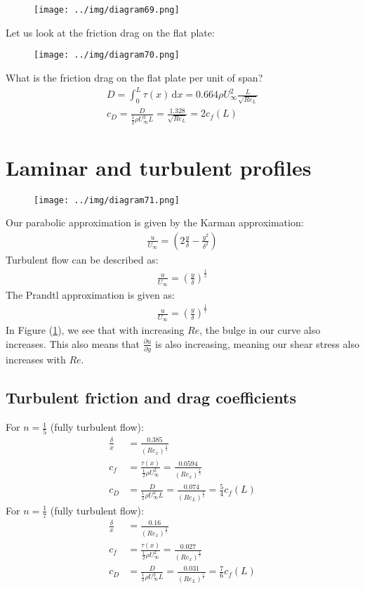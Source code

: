 \documentclass[class=report, crop=false, 12pt,a4paper]{standalone}
\begin{document}
\begin{figure}[H]
  \centering
  \texttt{[image: ../img/diagram69.png]}
\end{figure}
Let us look at the friction drag on the flat plate:
\begin{figure}[H]
  \centering
  \texttt{[image: ../img/diagram70.png]}
\end{figure}
What is the friction drag on the flat plate per unit of span?
\begin{align}
  D = \int_{0}^{L} \tau(x) \,\mathrm{d}x = 0.664 \rho U_\infty^2 \frac{L}{\sqrt{Re_L}}\\
  c_D = \frac{D}{\frac{1}{2}\rho U_\infty^2 L} = \frac{1.328}{\sqrt{Re_L}} = 2 c_f (L)
\end{align}
\section{Laminar and turbulent profiles}
\begin{figure}[H]
  \centering
  \texttt{[image: ../img/diagram71.png]}
  \label{lamturbpfs}
\end{figure}
Our parabolic approximation is given by the Karman approximation:
\begin{align}
  \frac{u}{U_\infty} = \left( 2 \frac{y}{\delta} - \frac{y^2}{\delta^2}\right)
\end{align}
Turbulent flow can be described as:
\begin{align}
  \frac{u}{U_\infty} = \left(\frac{y}{\delta}\right)^{\frac{1}{5}}
\end{align}
The Prandtl approximation is given as:
\begin{align}
  \frac{u}{U_\infty} = \left(\frac{y}{\delta}\right)^{\frac{1}{7}}
\end{align}
In Figure (\ref{lamturbpfs}), we see that with increasing $Re$, the bulge in our curve also increases. This also means that $\frac{\partial u}{\partial y}$ is also increasing, meaning our shear stress also increases with $Re$.
\subsection{Turbulent friction and drag coefficients}
For $n = \frac{1}{5}$ (fully turbulent flow):
\begin{align}
  \frac{\delta}{x} &= \frac{0.385}{(Re_x)^{\frac{1}{5}}}\\
  c_f &= \frac{\tau (x)}{\frac{1}{2}\rho U_\infty^2} = \frac{0.0594}{(Re_x)^\frac{1}{5}}\\
  c_D &= \frac{D}{\frac{1}{2} \rho U_\infty^2 L} = \frac{0.074}{(Re_L)^{\frac{1}{5}}} = \frac{5}{4} c_f (L)
\end{align}
For $n = \frac{1}{7}$ (fully turbulent flow):
\begin{align}
  \frac{\delta}{x} &= \frac{0.16}{(Re_x)^{\frac{1}{7}}}\\
  c_f &= \frac{\tau (x)}{\frac{1}{2} \rho U_\infty^2} = \frac{0.027}{(Re_x)^{\frac{1}{7}}}\\
  c_D &= \frac{D}{\frac{1}{2}\rho U_\infty^2 L} = \frac{0.031}{(Re_L)^{\frac{1}{7}}} = \frac{7}{6} c_f (L)
\end{align}
\end{document}
